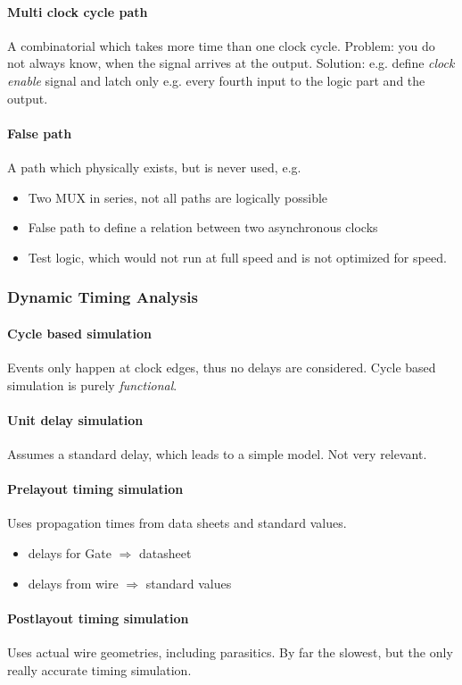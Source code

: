 \paragraph{Multi clock cycle path}A combinatorial which takes more time than one clock cycle. 
Problem: you do not always know, when the signal arrives at the output. 
Solution: e.g. define \emph{clock enable} signal and latch only e.g. every fourth input to the logic part and the output.

\paragraph{False path}A path which physically exists, but is never used, e.g.
\begin{itemize}
    \item Two MUX in series, not all paths are logically possible
    \item False path to define a relation between two asynchronous clocks
    \item Test logic, which would not run at full speed and is not optimized for speed.
\end{itemize}


\subsubsection{Dynamic Timing Analysis}
\paragraph{Cycle based simulation}
Events only happen at clock edges, thus no delays are considered.
Cycle based simulation is purely \emph{functional}.
\paragraph{Unit delay simulation}
Assumes a standard delay, which leads to a simple model. Not very relevant.
\paragraph{Prelayout timing simulation}
Uses propagation times from data sheets and standard values.
\begin{itemize}
	\item delays for Gate  $\Rightarrow$ datasheet
	\item delays from wire $\Rightarrow$ standard values
\end{itemize}
\paragraph{Postlayout timing simulation}
Uses actual wire geometries, including parasitics.
By far the slowest, but the only really accurate timing simulation.


